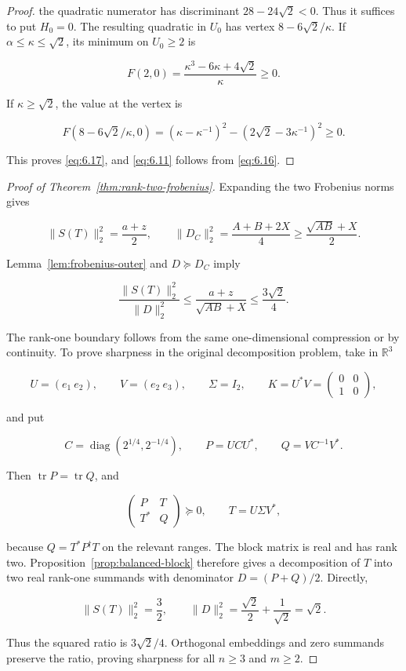 \documentclass[11pt]{article}
\begin{document}
\begin{proof}
the quadratic numerator has discriminant $28-24\sqrt2<0$. Thus it suffices to
put $H_0=0$. The resulting quadratic in $U_0$ has vertex
$8-6\sqrt2/\kappa$. If $\alpha\le\kappa\le\sqrt2$, its minimum on
$U_0\ge2$ is

\[
F(2,0)=\frac{\kappa^3-6\kappa+4\sqrt2}{\kappa}\ge0.
\tag{6.21}\label{eq:6.21}
\]

If $\kappa\ge\sqrt2$, the value at the vertex is

\[
F(8-6\sqrt2/\kappa,0)
=(\kappa-\kappa^{-1})^2-(2\sqrt2-3\kappa^{-1})^2\ge0.
\tag{6.22}\label{eq:6.22}
\]

This proves \eqref{eq:6.17}, and \eqref{eq:6.11} follows from \eqref{eq:6.16}.
\end{proof}


\begin{proof}[Proof of Theorem~\ref{thm:rank-two-frobenius}]
Expanding the two Frobenius norms gives

\[
\|S(T)\|_2^2=\frac{a+z}{2},\qquad
\|D_C\|_2^2=\frac{A+B+2X}{4}
\ge\frac{\sqrt{AB}+X}{2}.
\tag{6.23}\label{eq:6.23}
\]

Lemma~\ref{lem:frobenius-outer} and $D\succeq D_C$ imply

\[
\frac{\|S(T)\|_2^2}{\|D\|_2^2}
\le\frac{a+z}{\sqrt{AB}+X}
\le\frac{3\sqrt2}{4}.
\tag{6.24}\label{eq:6.24}
\]

The rank-one boundary follows from the same one-dimensional compression or by
continuity. To prove sharpness in the original decomposition problem, take in
$\mathbb R^3$

\[
U=(e_1\ e_2),\qquad V=(e_2\ e_3),\qquad
\Sigma=I_2,\qquad
K=U^*V=\begin{pmatrix}0&0\\1&0\end{pmatrix},
\tag{6.25}\label{eq:6.25}
\]

and put

\[
C=\operatorname{diag}(2^{1/4},2^{-1/4}),\qquad
P=UCU^*,\qquad Q=VC^{-1}V^*.
\tag{6.26}\label{eq:6.26}
\]

Then $\operatorname{tr}P=\operatorname{tr}Q$, and

\[
\begin{pmatrix}P&T\\T^*&Q\end{pmatrix}\succeq0,
\qquad T=U\Sigma V^*,
\tag{6.27}\label{eq:6.27}
\]

because $Q=T^*P^\dagger T$ on the relevant ranges. The block matrix is real
and has rank two. Proposition~\ref{prop:balanced-block} therefore gives a decomposition of $T$ into
two real rank-one summands with denominator $D=(P+Q)/2$. Directly,

\[
\|S(T)\|_2^2=\frac32,
\qquad
\|D\|_2^2=\frac{\sqrt2}{2}+\frac1{\sqrt2}=\sqrt2.
\tag{6.28}\label{eq:6.28}
\]

Thus the squared ratio is $3\sqrt2/4$. Orthogonal embeddings and zero summands
preserve the ratio, proving sharpness for all $n\ge3$ and $m\ge2$.

\end{proof}
\end{document}
